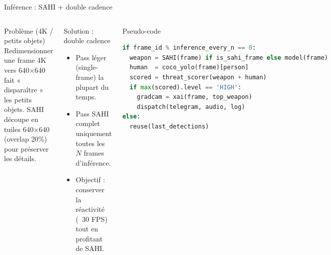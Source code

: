 \documentclass[aspectratio=169,11pt]{beamer}
\begin{document}
\begin{frame}{Inférence : SAHI + double cadence}
  \begin{columns}[T,onlytextwidth]
    \begin{block}{Problème (4K / petits objets)}
      Redimensionner une frame 4K vers 640×640 fait « disparaître » les petits objets.\newline
      SAHI découpe en tuiles 640×640 (overlap 20\%) pour préserver les détails.
    \end{block}

    \begin{block}{Solution : double cadence}
      \begin{itemize}
        \item Pass léger (single-frame) la plupart du temps.
        \item Pass SAHI complet uniquement toutes les \(N\) frames d'inférence.
        \item Objectif : conserver la réactivité (~30 FPS) tout en profitant de SAHI.
      \end{itemize}
    \end{block}

    \begin{block}{Pseudo-code}
\begin{lstlisting}[language=Python]
if frame_id % inference_every_n == 0:
  weapon = SAHI(frame) if is_sahi_frame else model(frame)
  human  = coco_yolo(frame)[person]
  scored = threat_scorer(weapon + human)
  if max(scored).level == 'HIGH':
    gradcam = xai(frame, top_weapon)
    dispatch(telegram, audio, log)
else:
  reuse(last_detections)
\end{lstlisting}
    \end{block}
  \end{columns}
\end{frame}
\end{document}
